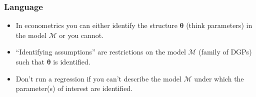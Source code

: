 \documentclass[english,xcolor=svgnames]{beamer}
\begin{document}
\begin{frame}
\frametitle[alignment=center]{Language}
\begin{itemize}
	\item In econometrics you can either identify the structure $\bm{\theta}$  (think parameters) in the model $\mathcal{M}$ or you cannot.
	\item ``Identifying assumptions'' are restrictions on the model $\mathcal{M}$ (family of DGPs) such that $\bm{\theta}$ is identified.
	\item Don't run a regression if you can't describe the model $\mathcal{M}$ under which the parameter(s) of interest are identified.
\end{itemize}
\end{frame}





%	
\end{document}
